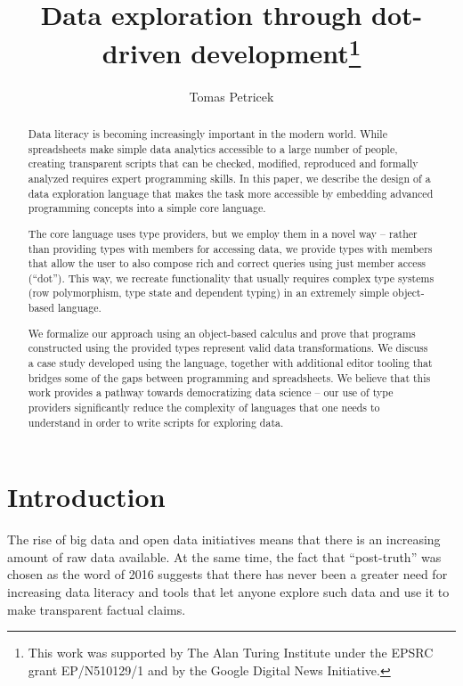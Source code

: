 \documentclass[a4paper,UKenglish]{lipics-v2016}
\title{Data exploration through dot-driven development\footnote{This 
  work was supported by The Alan Turing Institute under the EPSRC grant EP/N510129/1
  and by the Google Digital News Initiative.}}
\author[1]{Tomas Petricek}
\affil[1]{The Alan Turing Institute, London, UK\\
 and Microsoft Research, Cambridge, UK\\
  \texttt{tomas@tomasp.net}}
\theoremstyle{plain}
\theoremstyle{definition}
\begin{document}
\maketitle

\begin{abstract}
Data literacy is becoming increasingly important in the modern world. While spreadsheets make 
simple data analytics accessible to a large number of people, creating transparent scripts that 
can be checked, modified, reproduced and formally analyzed requires expert programming skills. 
In this paper, we describe the design of a data exploration language that makes the task more 
accessible by embedding advanced programming concepts into a simple core language.

The core language uses type providers, but we employ them in a novel way -- rather than providing 
types with members for accessing data, we provide types with members that allow the user to also 
compose rich and correct queries using just member access (``dot''). This way, we recreate 
functionality that usually requires complex type systems (row polymorphism, type state and dependent 
typing) in an extremely simple object-based language.

We formalize our approach using an object-based calculus and prove that programs constructed using 
the provided types represent valid data transformations. We discuss a case study developed using the 
language, together with additional editor tooling that bridges some of the gaps between programming 
and spreadsheets. We believe that this work provides a pathway towards democratizing data science 
-- our use of type providers significantly reduce the complexity of languages that one needs to 
understand in order to write scripts for exploring data.
\end{abstract}


\section{Introduction}
\label{sec:intro}

The rise of big data and open data initiatives means that there is an increasing amount of raw data 
available. At the same time, the fact that ``post-truth'' was chosen as the word of 2016 \cite{posttruth} 
suggests that there has never been a greater need for increasing data literacy and tools that let 
anyone explore such data and use it to make transparent factual claims.
\end{document}
